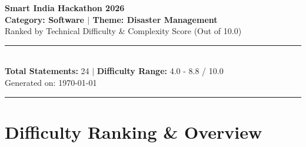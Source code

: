 \documentclass[10pt,a4paper]{article}
\begin{document}
\begin{center}
    \vspace*{0.4cm}
    {\Huge \textbf{\color{sihnavy}Smart India Hackathon 2026}}\\[0.35cm]
    {\LARGE \textbf{\color{sihblue}Category: Software \quad $\vert$ \quad Theme: Disaster Management}}\\[0.25cm]
    {\large \color{gray} Ranked by Technical Difficulty \& Complexity Score (Out of 10.0)}\\[0.4cm]
    \rule{0.85\textwidth}{1pt}\\[0.35cm]
    {\large \textbf{Total Statements: } 24 \quad $\vert$ \quad \textbf{Difficulty Range: } 4.0 - 8.8 / 10.0}\\[0.15cm]
    {\small \color{gray} Generated on: \today}
\end{center}

\vspace{0.4cm}
\hrule
\vspace{0.4cm}

\section*{Difficulty Ranking \& Overview}
\end{document}
